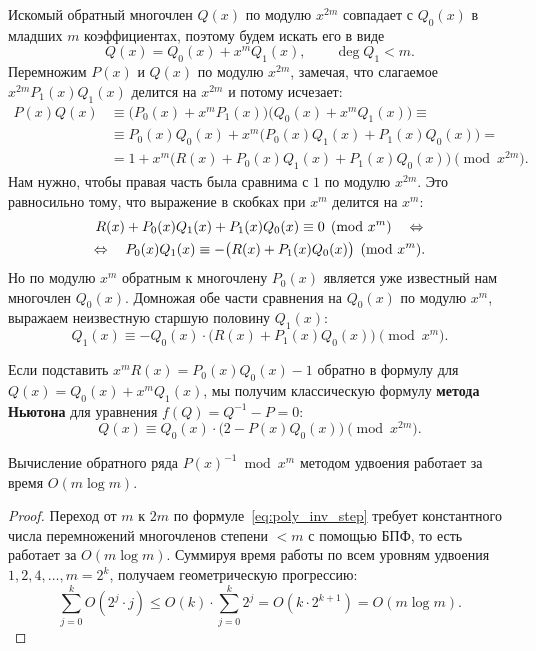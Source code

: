 Искомый обратный многочлен $Q(x)$ по модулю $x^{2m}$ совпадает с $Q_0(x)$ в младших $m$ коэффициентах, поэтому будем искать его в виде
\[
    Q(x) = Q_0(x) + x^m Q_1(x), \qquad \deg Q_1 < m.
\]
Перемножим $P(x)$ и $Q(x)$ по модулю $x^{2m}$, замечая, что слагаемое $x^{2m} P_1(x) Q_1(x)$ делится на $x^{2m}$ и потому исчезает:
\begin{align*}
    P(x) Q(x) &\equiv \bigl(P_0(x) + x^m P_1(x)\bigr) \bigl(Q_0(x) + x^m Q_1(x)\bigr) \equiv \\
    &\equiv P_0(x) Q_0(x) + x^m \bigl(P_0(x) Q_1(x) + P_1(x) Q_0(x)\bigr) = \\
    &= 1 + x^m \bigl(R(x) + P_0(x) Q_1(x) + P_1(x) Q_0(x)\bigr) \pmod{x^{2m}}.
\end{align*}
Нам нужно, чтобы правая часть была сравнима с $1$ по модулю $x^{2m}$. Это равносильно тому, что выражение в скобках при $x^m$ делится на $x^m$:
\begin{gather*}
    R(x) + P_0(x) Q_1(x) + P_1(x) Q_0(x) \equiv 0 \pmod{x^m} \quad \Leftrightarrow \\
    \Leftrightarrow \quad P_0(x) Q_1(x) \equiv -\bigl(R(x) + P_1(x) Q_0(x)\bigr) \pmod{x^m}.
\end{gather*}
Но по модулю $x^m$ обратным к многочлену $P_0(x)$ является уже известный нам многочлен $Q_0(x)$. Домножая обе части сравнения на $Q_0(x)$ по модулю $x^m$, выражаем неизвестную старшую половину $Q_1(x)$:
\begin{equation}\label{eq:poly_inv_step}
    Q_1(x) \equiv -Q_0(x) \cdot \bigl(R(x) + P_1(x) Q_0(x)\bigr) \pmod{x^m}.
\end{equation}
\begin{note}
    Если подставить $x^m R(x) = P_0(x) Q_0(x) - 1$ обратно в формулу для $Q(x) = Q_0(x) + x^m Q_1(x)$, мы получим классическую формулу \textbf{метода Ньютона} для уравнения $f(Q) = Q^{-1} - P = 0$:
    \[
        Q(x) \equiv Q_0(x) \cdot \bigl(2 - P(x) Q_0(x)\bigr) \pmod{x^{2m}}.
    \]
\end{note}

\begin{theorem}
    Вычисление обратного ряда $P(x)^{-1} \bmod x^m$ методом удвоения работает за время $O(m \log m)$.
\end{theorem}

\begin{proof}
    Переход от $m$ к $2m$ по формуле~\eqref{eq:poly_inv_step} требует константного числа перемножений многочленов степени $< m$ с помощью БПФ, то есть работает за $O(m \log m)$. Суммируя время работы по всем уровням удвоения $1, 2, 4, \dots, m = 2^k$, получаем геометрическую прогрессию:
    \[
        \sum_{j=0}^k O(2^j \cdot j) \le O(k) \cdot \sum_{j=0}^k 2^j = O(k \cdot 2^{k+1}) = O(m \log m).
    \]
\end{proof}

